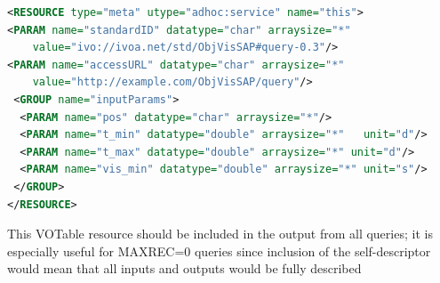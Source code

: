 \documentclass[11pt,a4paper]{ivoa}
\begin{document}
\begin{lstlisting}[language=XML]
<RESOURCE type="meta" utype="adhoc:service" name="this">
<PARAM name="standardID" datatype="char" arraysize="*"
    value="ivo://ivoa.net/std/ObjVisSAP#query-0.3"/>
<PARAM name="accessURL" datatype="char" arraysize="*"
    value="http://example.com/ObjVisSAP/query"/>
 <GROUP name="inputParams">
  <PARAM name="pos" datatype="char" arraysize="*"/>
  <PARAM name="t_min" datatype="double" arraysize="*"	unit="d"/>
  <PARAM name="t_max" datatype="double" arraysize="*" unit="d"/>
  <PARAM name="vis_min" datatype="double" arraysize="*"	unit="s"/>
 </GROUP>
</RESOURCE>
\end{lstlisting}

This VOTable resource should be included in the output from all queries;
it is especially useful for MAXREC=0 queries since inclusion of the
self-descriptor would mean that all inputs and outputs would be fully
described
\end{document}
